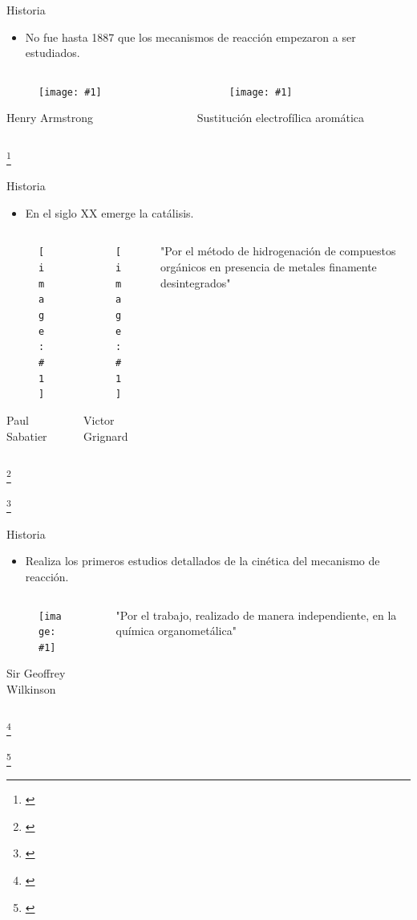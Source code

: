 \documentclass[handout]{beamer}
\newcommand\blfootnote[1]
{%
	\begingroup
	\renewcommand\thefootnote{}\footnote{#1}%
	\addtocounter{footnote}{-1}%
	\endgroup
}
\newcommand{\fcite}[1]{\blfootnote{\cite{#1}}}
\newcommand{\cfigure}[2]
{
	\begin{figure}
		\centering
		\texttt{[image: \#1]}
	\end{figure}
}
\begin{document}
\begin{frame}{Historia}
	\begin{itemize}
		\item No fue hasta 1887 que los mecanismos de reacción empezaron a ser estudiados.
	\end{itemize}
	\begin{columns}
		\begin{column}{0.2\textwidth}
			\cfigure{sources/Henry_Armstrong.jpg}{\textwidth}
			Henry Armstrong
		\end{column}
		\begin{column}{0.6\textwidth}
			\cfigure{sources/SE.png}{\linewidth}
			Sustitución electrofílica aromática
		\end{column}
	\end{columns}
	\fcite{armstrong1887xxviii}
\end{frame}

\begin{frame}{Historia}
	\begin{itemize}
		\item En el siglo XX emerge la catálisis.
	\end{itemize}
	\begin{columns}
		\begin{column}{0.2\textwidth}
			\cfigure{sources/sabatier.jpg}{\textwidth}
			Paul Sabatier
		\end{column}
		\begin{column}{0.3\textwidth}
			\cfigure{sources/grignard.jpg}{0.7\linewidth}
			Victor Grignard
		\end{column}
		\begin{column}{0.5\textwidth}
			"Por el método de hidrogenación de compuestos orgánicos en presencia de metales finamente desintegrados"
		\end{column}
	\end{columns}
	\fcite{astruc2007organometallic}
	\fcite{kagan2012victor}
\end{frame}

\begin{frame}{Historia}
	\begin{itemize}
		\item Realiza los primeros estudios detallados de la cinética del mecanismo de reacción.
	\end{itemize}
	\begin{columns}
		\begin{column}{0.2\textwidth}
			\cfigure{sources/wilkinson1.png}{\textwidth}
			Sir Geoffrey Wilkinson
		\end{column}
		\begin{column}{0.5\textwidth}
			"Por el trabajo, realizado de manera independiente, en la química organometálica"
		\end{column}
	\end{columns}
	\fcite{astruc2007organometallic}
	\fcite{kagan2012victor}
\end{frame}
\end{document}
